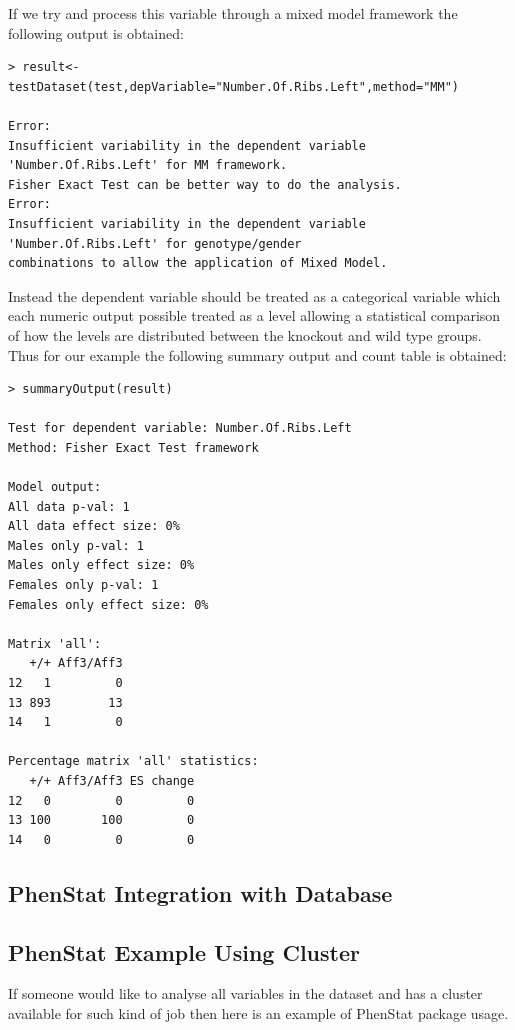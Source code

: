 \documentclass[12pt,a4paper]{article}
\begin{document}
If we try and process this variable through a mixed model framework the following output is obtained: 


\begingroup
    \fontsize{8pt}{12pt}\selectfont
\begin{verbatim}
> result<-testDataset(test,depVariable="Number.Of.Ribs.Left",method="MM")

Error:
Insufficient variability in the dependent variable 'Number.Of.Ribs.Left' for MM framework. 
Fisher Exact Test can be better way to do the analysis.
Error:
Insufficient variability in the dependent variable 'Number.Of.Ribs.Left' for genotype/gender 
combinations to allow the application of Mixed Model.
\end{verbatim}
\endgroup 

Instead the dependent variable should be treated as a categorical variable which each numeric output possible treated as a level allowing 
a statistical comparison of how the levels are distributed between the knockout and wild type groups.  
Thus for our example the following summary output and count table is obtained: 

\begingroup
    \fontsize{8pt}{12pt}\selectfont
\begin{verbatim}
> summaryOutput(result)

Test for dependent variable: Number.Of.Ribs.Left
Method: Fisher Exact Test framework

Model output:
All data p-val: 1
All data effect size: 0%
Males only p-val: 1
Males only effect size: 0%
Females only p-val: 1
Females only effect size: 0%

Matrix 'all':
   +/+ Aff3/Aff3
12   1         0
13 893        13
14   1         0

Percentage matrix 'all' statistics:
   +/+ Aff3/Aff3 ES change
12   0         0         0
13 100       100         0
14   0         0         0

\end{verbatim}
\endgroup 



\subsection{PhenStat Integration with Database}
\subsection{PhenStat Example Using Cluster}
If someone would like to analyse all variables in the dataset and has a cluster available for such kind of job then here is an example of PhenStat package usage.
\end{document}
